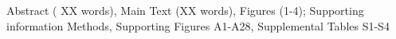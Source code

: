 \documentclass[lineno,Numbered]{sn-jnl}%
\makeatletter
\def\filecountsname{This file contains}%
\def\filecounts#1{\ifx#1\empty\else\def\@filecounts{\par\addvspace{10pt}{\keywordfont{\bfseries\filecountsname:} #1\par}}\fi}%
\def\@filecounts{}%
\makeatother
\begin{document}
	
	
    \filecounts{Abstract ( XX words), Main Text (XX words), Figures (1-4); Supporting information Methods, Supporting Figures A1-A28, Supplemental Tables S1-S4}
	
	
	
	\maketitle
	
\end{document}
